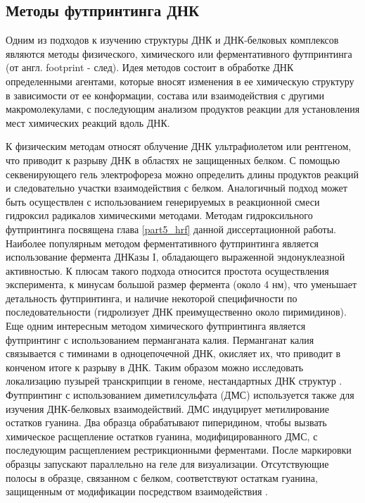 \subsection{Методы футпринтинга ДНК}
Одним из подходов к изучению структуры ДНК и ДНК-белковых комплексов являются методы физического, химического или ферментативного футпринтинга (от англ. footprint - след). Идея методов состоит в обработке ДНК определенными агентами, которые вносят изменения в ее химическую структуру в зависимости от ее конформации, состава или взаимодействия с другими макромолекулами, с последующим анализом продуктов реакции для установления мест химических реакций вдоль ДНК.

К физическим методам относят облучение ДНК ультрафиолетом \cite{becker_ultraviolet_1988} или рентгеном, что приводит к разрыву ДНК в областях не защищенных белком. С помощью секвенирующего гель электрофореза можно определить длины продуктов реакций и следовательно участки взаимодействия с белком. Аналогичный подход может быть осуществлен с использованием генерируемых в реакционной смеси гидроксил радикалов химическими методами. Методам гидроксильного футпринтинга посвящена глава \ref{part5_hrf} данной диссертационной работы. Наиболее популярным методом ферментативного футпринтинга является использование фермента ДНКазы I, обладающего выраженной эндонуклеазной активностью. К плюсам такого подхода относится простота осуществления эксперимента, к минусам большой размер фермента (около 4 нм), что уменьшает детальность футпринтинга, и наличие некоторой специфичности по последовательности (гидролизует ДНК преимущественно около пиримидинов). Еще одним интересным методом химического футпринтинга является футпринтинг с использованием перманганата калия. Перманганат калия связывается с тиминами в одноцепочечной ДНК, окисляет их, что приводит в конченом итоге к разрыву в ДНК. Таким образом можно исследовать локализацию пузырей транскрипции в геноме, нестандартных ДНК структур  \cite{kouzine_permanganates1_2017}. Футпринтинг с использованием диметилсульфата (ДМС) используется также для изучения ДНК-белковых взаимодействий. ДМС индуцирует метилирование остатков гуанина. Два образца обрабатывают пиперидином, чтобы вызвать химическое расщепление остатков гуанина, модифицированного ДМС, с последующим расщеплением рестрикционными ферментами. После маркировки образцы запускают параллельно на геле для визуализации. Отсутствующие полосы в образце, связанном с белком, соответствуют остаткам гуанина, защищенным от модификации посредством взаимодействия \cite{hornstra_vivo_1993}.
